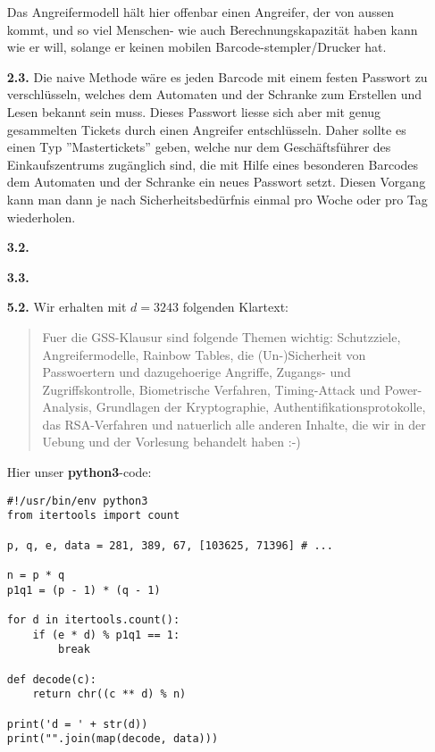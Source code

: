 \documentclass[a4paper,11pt]{article}
\begin{document}
\begin{enumerate}
    Das Angreifermodell hält hier offenbar einen Angreifer, der von aussen kommt, und so viel Menschen- wie auch Berechnungskapazität haben kann wie er will, solange er keinen mobilen Barcode-stempler/Drucker hat.

\item[\textbf{2.3.}]
    Die naive Methode wäre es jeden Barcode mit einem festen Passwort zu verschlüsseln, welches dem Automaten und der Schranke zum Erstellen und Lesen bekannt sein muss. Dieses Passwort liesse sich aber mit genug gesammelten Tickets durch einen Angreifer entschlüsseln. Daher sollte es einen Typ ''Mastertickets'' geben, welche nur dem Geschäftsführer des Einkaufszentrums zugänglich sind, die mit Hilfe eines besonderen Barcodes dem Automaten und der Schranke ein neues Passwort setzt. Diesen Vorgang kann man dann je nach Sicherheitsbedürfnis einmal pro Woche oder pro Tag wiederholen.

\item[\textbf{3.2.}]

\item[\textbf{3.3.}]

\item[\textbf{5.2.}]
    Wir erhalten mit $d=3243$ folgenden Klartext:
    \begin{quote}
        Fuer die GSS-Klausur sind folgende Themen wichtig: Schutzziele, Angreifermodelle, Rainbow Tables, die (Un-)Sicherheit von Passwoertern und dazugehoerige Angriffe, Zugangs- und Zugriffskontrolle, Biometrische Verfahren, Timing-Attack und Power-Analysis, Grundlagen der Kryptographie, Authentifikationsprotokolle, das RSA-Verfahren und natuerlich alle anderen Inhalte, die wir in der Uebung und der Vorlesung behandelt haben :-)
    \end{quote}

    Hier unser \textbf{python3}-code:\begin{verbatim}
#!/usr/bin/env python3
from itertools import count

p, q, e, data = 281, 389, 67, [103625, 71396] # ...

n = p * q
p1q1 = (p - 1) * (q - 1)

for d in itertools.count():
    if (e * d) % p1q1 == 1:
        break

def decode(c):
    return chr((c ** d) % n)

print('d = ' + str(d))
print("".join(map(decode, data)))
\end{verbatim}

\end{enumerate}
\end{document}
